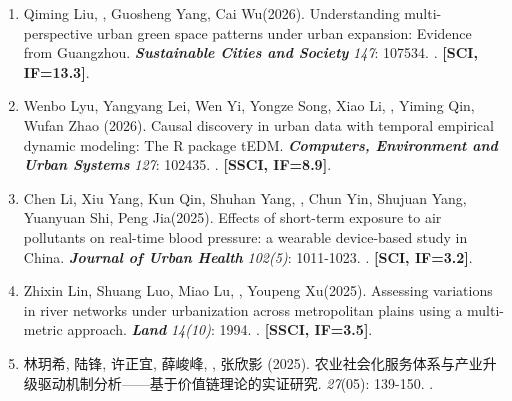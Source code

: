 \begin{enumerate}
    Measuring causal strengths from spatial cross-sectional data with geographical cross mapping cardinality.
    \textbf{\textit{International Journal of Geographical Information Science}} \textit{online first}: 1-23.
    . \textbf{[SCI/SSCI, IF=5.9]}.
\item
    Qiming Liu, \Shaoqing, Guosheng Yang, Cai Wu\CS (2026).
    Understanding multi-perspective urban green space patterns under urban expansion: Evidence from Guangzhou.
    \textbf{\textit{Sustainable Cities and Society}} \textit{147}: 107534.
    . \textbf{[SCI, IF=13.3]}.
\item
    Wenbo Lyu, Yangyang Lei, Wen Yi, Yongze Song, Xiao Li, \Shaoqing, Yiming Qin, Wufan Zhao (2026).
    Causal discovery in urban data with temporal empirical dynamic modeling: The R package tEDM.
    \textbf{\textit{Computers, Environment and Urban Systems}} \textit{127}: 102435.
    . \textbf{[SSCI, IF=8.9]}.
\item
    Chen Li, Xiu Yang, Kun Qin, Shuhan Yang, \Shaoqing, Chun Yin, Shujuan Yang, Yuanyuan Shi\CS, Peng Jia\CS (2025).
    Effects of short-term exposure to air pollutants on real-time blood pressure: a wearable device-based study in China.
    \textbf{\textit{Journal of Urban Health}} \textit{102(5)}: 1011-1023.
    . \textbf{[SCI, IF=3.2]}.
\item
    Zhixin Lin, Shuang Luo, Miao Lu, \Shaoqing, Youpeng Xu\CS (2025).
    Assessing variations in river networks under urbanization across metropolitan plains using a multi-metric approach.
    \textbf{\textit{Land}} \textit{14(10)}: 1994.
    . \textbf{[SSCI, IF=3.5]}.
\item
    林玥希, 陆锋, 许正宜, 薛峻峰, {}, 张欣影 (2025).
    农业社会化服务体系与产业升级驱动机制分析——基于价值链理论的实证研究.
    \textbf{} \textit{27}(05): 139-150.
    .


\end{enumerate}
